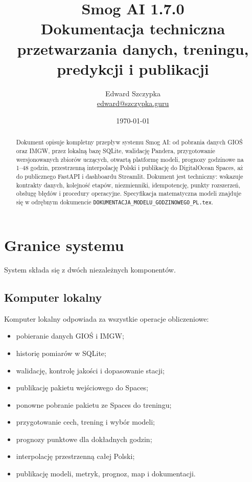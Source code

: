 \documentclass[11pt,a4paper,oneside]{article}
\title{\textbf{Smog AI 1.7.0}\\[0.2em]
\textbf{Dokumentacja techniczna przetwarzania danych, treningu, predykcji i publikacji}}
\author{Edward Szczypka\\\href{mailto:edward@szczypka.guru}{edward@szczypka.guru}}
\date{\today}
\begin{document}
\maketitle

\begin{abstract}
Dokument opisuje kompletny przepływ systemu Smog AI: od pobrania danych GIOŚ
oraz IMGW, przez lokalną bazę SQLite, walidację Pandera, przygotowanie
wersjonowanych zbiorów uczących, otwartą platformę modeli, prognozy godzinowe
na 1--48 godzin, przestrzenną interpolację Polski i publikację do DigitalOcean
Spaces, aż do publicznego FastAPI i dashboardu Streamlit. Dokument jest
techniczny: wskazuje kontrakty danych, kolejność etapów, niezmienniki,
idempotencję, punkty rozszerzeń, obsługę błędów i procedury operacyjne.
Specyfikacja matematyczna modeli znajduje się w odrębnym dokumencie
\texttt{DOKUMENTACJA\_MODELU\_GODZINOWEGO\_PL.tex}.
\end{abstract}

\tableofcontents
\newpage

\section{Granice systemu}

System składa się z dwóch niezależnych komponentów.

\subsection{Komputer lokalny}

Komputer lokalny odpowiada za wszystkie operacje obliczeniowe:
\begin{itemize}[nosep]
  \item pobieranie danych GIOŚ i IMGW;
  \item historię pomiarów w SQLite;
  \item walidację, kontrolę jakości i dopasowanie stacji;
  \item publikację pakietu wejściowego do Spaces;
  \item ponowne pobranie pakietu ze Spaces do treningu;
  \item przygotowanie cech, trening i wybór modeli;
  \item prognozy punktowe dla dokładnych godzin;
  \item interpolację przestrzenną całej Polski;
  \item publikację modeli, metryk, prognoz, map i dokumentacji.
\end{itemize}
\end{document}
